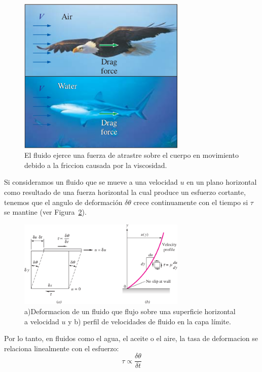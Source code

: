 \documentclass[10pt, oneside]{article}
\begin{document}
\begin{figure}[h]
\centering
\includegraphics[width=8cm]{visco0}
\caption{El fluido ejerce una fuerza de atrastre sobre el cuerpo en movimiento debido a la friccion causada por la viscosidad.}
\label{visco0}
\end{figure}



Si consideramos un fluido que se mueve a una velocidad $u$ en un plano horizontal como resultado de una fuerza horizontal la cual produce un esfuerzo cortante, tenemos que el angulo de deformaci\'on $\delta \theta$ crece continuamente con el tiempo si $\tau$ se mantine (ver Figura~\ref{visco}).

\begin{figure}[h]
\centering
\includegraphics[width=8cm]{visco}
\caption{a)Deformacion de un fluido que flujo sobre una superficie horizontal a velocidad $u$ y  b) perfil de velocidades de fluido en la capa l\'imite.}
\label{visco}
\end{figure}

Por lo tanto, en fluidos como el agua, el aceite o el aire, la tasa de deformacion se relaciona linealmente con el esfuerzo:
\begin{equation}
\tau \propto \frac{\delta \theta}{\delta t}
\label{vis1}
\end{equation}
\end{document}
